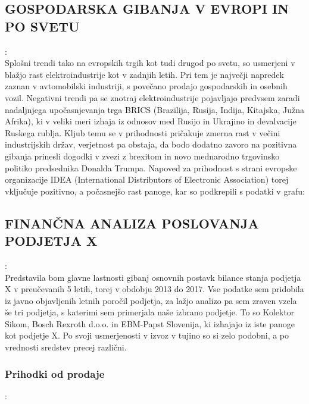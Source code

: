 \documentclass[12pt,a4paper]{amsart}
\theoremstyle{definition} %
\theoremstyle{plain} %
\begin{document}
\subsection{GOSPODARSKA GIBANJA V EVROPI IN PO SVETU}:\\

Splošni trendi tako na evropskih trgih kot tudi drugod po svetu, so usmerjeni v blažjo rast elektroindustrije kot v zadnjih letih. Pri tem je največji napredek zaznan v avtomobilski industriji, s povečano prodajo gospodarskih in osebnih vozil. Negativni trendi pa se znotraj elektroindustrije pojavljajo predvsem zaradi nadaljnjega upočasnjevanja trga BRICS (Brazilija, Rusija, Indija, Kitajska, Južna Afrika), ki v veliki meri izhaja iz odnosov med Rusijo in Ukrajino in devalvacije Ruskega rublja. %
Kljub temu se v prihodnosti pričakuje zmerna rast v večini industrijskih držav, verjetnost pa obstaja, da bodo dodatno zavoro na pozitivna gibanja prinesli dogodki v zvezi z brexitom in novo mednarodno trgovinsko politiko predsednika Donalda Trumpa. Napoved za prihodnost s strani evropske organizacije IDEA (International Distributors of Electronic Association) torej vključuje pozitivno, a počasnejšo rast panoge, kar so podkrepili s podatki v grafu:



\subsection{FINANČNA ANALIZA POSLOVANJA PODJETJA X}:\\

Predstavila bom glavne lastnosti gibanj osnovnih postavk bilance stanja podjetja X v preučevanih 5 letih, torej v obdobju 2013 do 2017. Vse podatke sem pridobila iz javno objavljenih letnih poročil podjetja, za lažjo analizo pa sem zraven vzela še tri podjetja, s katerimi sem primerjala naše izbrano podjetje. To so Kolektor Sikom, Bosch Rexroth d.o.o. in EBM-Papst Slovenija, ki izhajajo iz iste panoge kot podjetje X. Po svoji usmerjenosti v izvoz v tujino so si zelo podobni, a po vrednosti sredstev precej različni.\\

\subsubsection{Prihodki od prodaje}:\\
\end{document}
